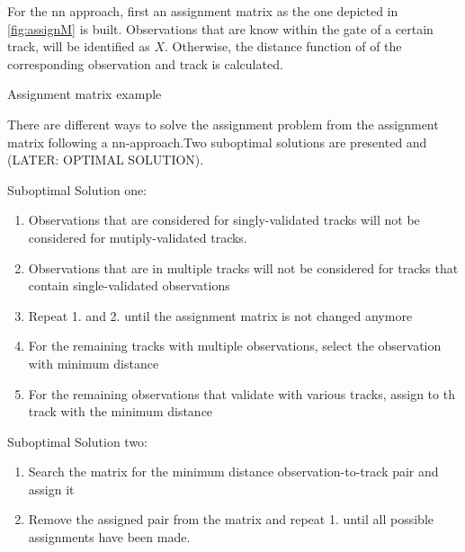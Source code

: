 For the \ac{nn} approach, first an assignment matrix as the one depicted in \cref{fig:assignM} is built. Observations that are know within the gate of a certain track, will be identified as $X$. Otherwise, the distance function of of the corresponding observation and track is calculated. 

\begin{table}[h]
	\centering
	
	\caption{Assignment matrix example}
	\label{fig:assignM}
\end{table} 

There are different ways to solve the assignment problem from the assignment matrix following a \ac{nn}-approach.Two suboptimal solutions are presented and (LATER: OPTIMAL SOLUTION).

Suboptimal Solution one:
\begin{enumerate}
	\item Observations that are considered for singly-validated tracks will not be considered for mutiply-validated tracks. 
	\item Observations that are in multiple tracks will not be considered for tracks that contain single-validated observations
	\item Repeat 1. and 2. until the assignment matrix is not changed anymore 
	\item For the remaining tracks with multiple observations, select the observation with minimum distance 
	\item For the remaining observations that validate with various tracks, assign to th track with the minimum distance
\end{enumerate}

Suboptimal Solution two:
\begin{enumerate}
    \item Search the matrix for the minimum distance observation-to-track pair and assign it
    \item  Remove the assigned pair from the matrix and repeat 1. until all possible assignments have been made. 
\end{enumerate}
